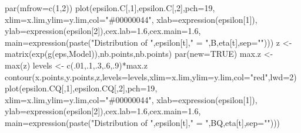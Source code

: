 \documentclass[
]{book}
\newenvironment{Shaded}{\begin{snugshade}}{\end{snugshade}}
\newcommand{\AttributeTok}[1]{\textcolor[rgb]{0.77,0.63,0.00}{#1}}
\newcommand{\ConstantTok}[1]{\textcolor[rgb]{0.00,0.00,0.00}{#1}}
\newcommand{\DecValTok}[1]{\textcolor[rgb]{0.00,0.00,0.81}{#1}}
\newcommand{\FloatTok}[1]{\textcolor[rgb]{0.00,0.00,0.81}{#1}}
\newcommand{\FunctionTok}[1]{\textcolor[rgb]{0.00,0.00,0.00}{#1}}
\newcommand{\NormalTok}[1]{#1}
\newcommand{\OtherTok}[1]{\textcolor[rgb]{0.56,0.35,0.01}{#1}}
\newcommand{\SpecialCharTok}[1]{\textcolor[rgb]{0.00,0.00,0.00}{#1}}
\newcommand{\StringTok}[1]{\textcolor[rgb]{0.31,0.60,0.02}{#1}}
\theoremstyle{definition}
\theoremstyle{definition}
\theoremstyle{definition}
\theoremstyle{definition}
\theoremstyle{remark}
\begin{document}
\begin{Shaded}
\begin{Highlighting}[]
\FunctionTok{par}\NormalTok{(}\AttributeTok{mfrow=}\FunctionTok{c}\NormalTok{(}\DecValTok{1}\NormalTok{,}\DecValTok{2}\NormalTok{))}
\FunctionTok{plot}\NormalTok{(epsilon.C[,}\DecValTok{1}\NormalTok{],epsilon.C[,}\DecValTok{2}\NormalTok{],}\AttributeTok{pch=}\DecValTok{19}\NormalTok{,}
     \AttributeTok{xlim=}\NormalTok{x.lim,}\AttributeTok{ylim=}\NormalTok{y.lim,}\AttributeTok{col=}\StringTok{"\#00000044"}\NormalTok{,}
     \AttributeTok{xlab=}\FunctionTok{expression}\NormalTok{(epsilon[}\DecValTok{1}\NormalTok{]),}
     \AttributeTok{ylab=}\FunctionTok{expression}\NormalTok{(epsilon[}\DecValTok{2}\NormalTok{]),}\AttributeTok{cex.lab=}\FloatTok{1.6}\NormalTok{,}\AttributeTok{cex.main=}\FloatTok{1.6}\NormalTok{,}
     \AttributeTok{main=}\FunctionTok{expression}\NormalTok{(}\FunctionTok{paste}\NormalTok{(}\StringTok{"Distribution of "}\NormalTok{,epsilon[t],}\StringTok{" = "}\NormalTok{,B,eta[t],}\AttributeTok{sep=}\StringTok{""}\NormalTok{)))}
\NormalTok{z }\OtherTok{\textless{}{-}} \FunctionTok{matrix}\NormalTok{(}\FunctionTok{exp}\NormalTok{(}\FunctionTok{g}\NormalTok{(eps,Model)),nb.points,nb.points)}
\FunctionTok{par}\NormalTok{(}\AttributeTok{new=}\ConstantTok{TRUE}\NormalTok{)}
\NormalTok{max.z }\OtherTok{\textless{}{-}} \FunctionTok{max}\NormalTok{(z)}
\NormalTok{levels }\OtherTok{\textless{}{-}} \FunctionTok{c}\NormalTok{(.}\DecValTok{01}\NormalTok{,.}\DecValTok{1}\NormalTok{,.}\DecValTok{3}\NormalTok{,.}\DecValTok{6}\NormalTok{,.}\DecValTok{9}\NormalTok{)}\SpecialCharTok{*}\NormalTok{max.z}
\FunctionTok{contour}\NormalTok{(x.points,y.points,z,}\AttributeTok{levels=}\NormalTok{levels,}\AttributeTok{xlim=}\NormalTok{x.lim,}\AttributeTok{ylim=}\NormalTok{y.lim,}\AttributeTok{col=}\StringTok{"red"}\NormalTok{,}\AttributeTok{lwd=}\DecValTok{2}\NormalTok{)}
\FunctionTok{plot}\NormalTok{(epsilon.CQ[,}\DecValTok{1}\NormalTok{],epsilon.CQ[,}\DecValTok{2}\NormalTok{],}\AttributeTok{pch=}\DecValTok{19}\NormalTok{,}
     \AttributeTok{xlim=}\NormalTok{x.lim,}\AttributeTok{ylim=}\NormalTok{y.lim,}\AttributeTok{col=}\StringTok{"\#00000044"}\NormalTok{,}
     \AttributeTok{xlab=}\FunctionTok{expression}\NormalTok{(epsilon[}\DecValTok{1}\NormalTok{]),}
     \AttributeTok{ylab=}\FunctionTok{expression}\NormalTok{(epsilon[}\DecValTok{2}\NormalTok{]),}\AttributeTok{cex.lab=}\FloatTok{1.6}\NormalTok{,}\AttributeTok{cex.main=}\FloatTok{1.6}\NormalTok{,}
     \AttributeTok{main=}\FunctionTok{expression}\NormalTok{(}\FunctionTok{paste}\NormalTok{(}\StringTok{"Distribution of "}\NormalTok{,epsilon[t],}\StringTok{" = "}\NormalTok{,BQ,eta[t],}\AttributeTok{sep=}\StringTok{""}\NormalTok{)))}

\end{Highlighting}
\end{Shaded}
\end{document}
